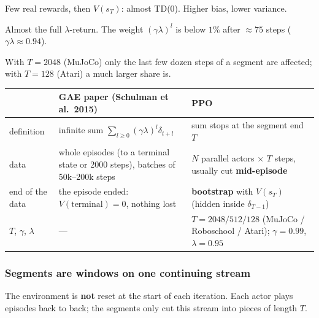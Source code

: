 \begin{pair}
\begin{warmbox}[title={Near the end of a segment ($T-t$ small)}]
\small Few real rewards, then $V(s_T)$: almost TD(0). Higher bias, lower variance.
\end{warmbox}
\begin{coolbox}[title={Near the start ($T-t$ large)}]
\small Almost the full $\lambda$-return. The weight $(\gamma\lambda)^l$ is below $1\%$ after $\approx 75$ steps ($\gamma\lambda\approx0.94$).
\end{coolbox}
\end{pair}

{\small With $T=2048$ (MuJoCo) only the last few dozen steps of a segment are affected; with $T=128$ (Atari) a much larger share is.}

\begin{center}
\small
\begin{tabularx}{\linewidth}{@{}l L L@{}}
\toprule
 & \textbf{GAE paper} (Schulman et al.\ 2015) & \textbf{\color{AtlasCool}PPO} \\
\midrule
definition & infinite sum $\sum_{l\ge0}(\gamma\lambda)^l\delta_{t+l}$ & sum stops at the segment end $T$ \\
data & whole episodes (to a terminal state or 2000 steps), batches of 50k--200k steps & $N$ parallel actors $\times$ $T$ steps, usually cut \textbf{mid-episode} \\
end of the data & the episode ended: $V(\text{terminal})=0$, nothing lost & \textbf{bootstrap} with $V(s_T)$ (hidden inside $\delta_{T-1}$) \\
$T$, $\gamma$, $\lambda$ & --- & $T=2048 / 512 / 128$ (MuJoCo / Roboschool / Atari); $\gamma=0.99$, $\lambda=0.95$ \\
\bottomrule
\end{tabularx}
\end{center}

\subsubsection*{Segments are windows on one continuing stream}

The environment is \textbf{not} reset at the start of each iteration. Each actor plays episodes back to back; the segments only cut this stream into pieces of length $T$.

